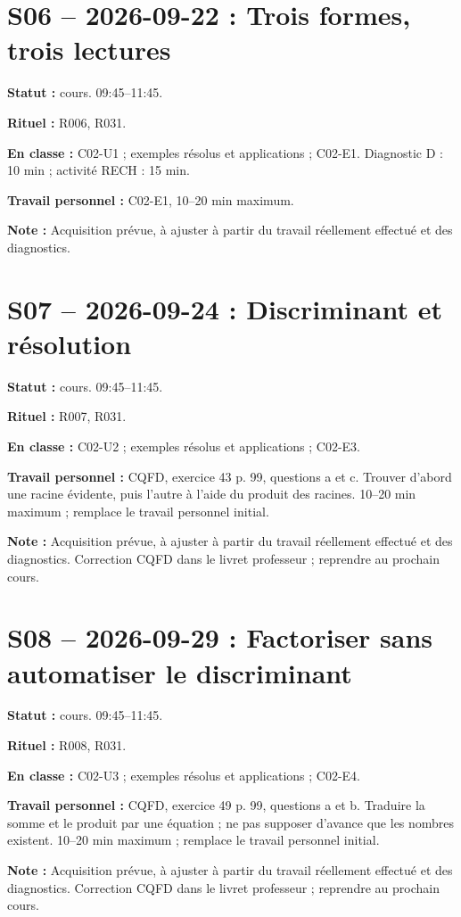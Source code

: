 \section*{S06 -- 2026-09-22 : Trois formes, trois lectures}
\textbf{Statut :} cours. 09:45–11:45.\par\textbf{Rituel :} R006, R031.\par\textbf{En classe :} C02-U1 ; exemples résolus et applications ; C02-E1. Diagnostic D : 10 min ; activité RECH : 15 min.\par\textbf{Travail personnel :} C02-E1, 10–20 min maximum.\par\textbf{Note :} Acquisition prévue, à ajuster à partir du travail réellement effectué et des diagnostics.
\section*{S07 -- 2026-09-24 : Discriminant et résolution}
\textbf{Statut :} cours. 09:45–11:45.\par\textbf{Rituel :} R007, R031.\par\textbf{En classe :} C02-U2 ; exemples résolus et applications ; C02-E3. \par\textbf{Travail personnel :} CQFD, exercice 43 p. 99, questions a et c. Trouver d’abord une racine évidente, puis l’autre à l’aide du produit des racines. 10–20 min maximum ; remplace le travail personnel initial.\par\textbf{Note :} Acquisition prévue, à ajuster à partir du travail réellement effectué et des diagnostics. Correction CQFD dans le livret professeur ; reprendre au prochain cours.
\section*{S08 -- 2026-09-29 : Factoriser sans automatiser le discriminant}
\textbf{Statut :} cours. 09:45–11:45.\par\textbf{Rituel :} R008, R031.\par\textbf{En classe :} C02-U3 ; exemples résolus et applications ; C02-E4. \par\textbf{Travail personnel :} CQFD, exercice 49 p. 99, questions a et b. Traduire la somme et le produit par une équation ; ne pas supposer d’avance que les nombres existent. 10–20 min maximum ; remplace le travail personnel initial.\par\textbf{Note :} Acquisition prévue, à ajuster à partir du travail réellement effectué et des diagnostics. Correction CQFD dans le livret professeur ; reprendre au prochain cours.
